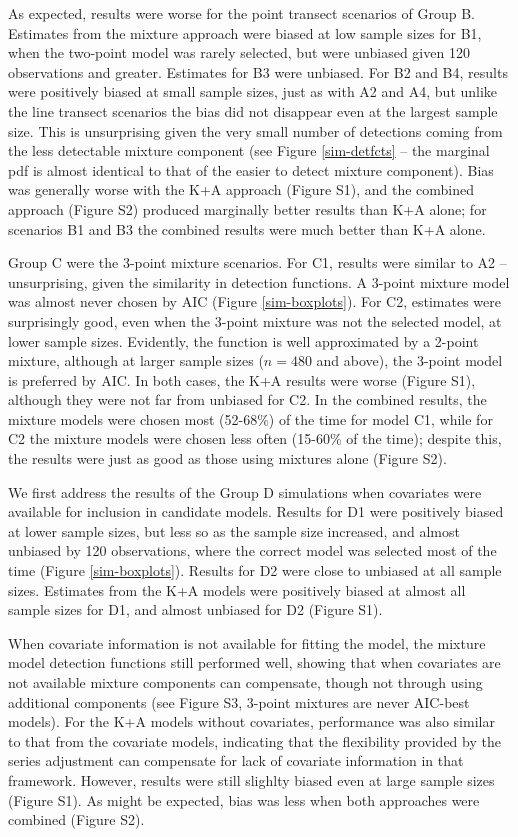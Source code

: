 \documentclass[10pt]{article}
\begin{document}
As expected, results were worse for the point transect scenarios of Group B. Estimates from the mixture approach were biased at low sample sizes for B1, when the two-point model was rarely selected, but were unbiased given 120 observations and greater. Estimates for B3 were unbiased.  For B2 and B4, results were positively biased at small sample sizes, just as with A2 and A4, but unlike the line transect scenarios the bias did not disappear even at the largest sample size. This is unsurprising given the very small number of detections coming from the less detectable mixture component (see Figure \ref{sim-detfcts} -- the marginal pdf is almost identical to that of the easier to detect mixture component). Bias was generally worse with the K+A approach (Figure S1), and the combined approach (Figure S2) produced marginally better results than K+A alone; for scenarios B1 and B3 the combined results were much better than K+A alone. 

Group C were the 3-point mixture scenarios.  For C1, results were similar to A2 -- unsurprising, given the similarity in detection functions.  A 3-point mixture model was almost never chosen by AIC (Figure \ref{sim-boxplots}).  For C2, estimates were surprisingly good, even when the 3-point mixture was not the selected model, at lower sample sizes.  Evidently, the function is well approximated by a 2-point mixture, although at larger sample sizes ($n=480$ and above), the 3-point model is preferred by AIC. In both cases, the K+A results were worse (Figure S1), although they were not far from unbiased for C2.  In the combined results, the mixture models were chosen most (52-68\%) of the time for model C1, while for C2 the mixture models were chosen less often (15-60\% of the time); despite this, the results were just as good as those using mixtures alone (Figure S2).

We first address the results of the Group D simulations when covariates were available for inclusion in candidate models. Results for D1 were positively biased at lower sample sizes, but less so as the sample size increased, and almost unbiased by 120 observations, where the correct model was selected most of the time (Figure \ref{sim-boxplots}).  Results for D2 were close to unbiased at all sample sizes. Estimates from the K+A models were positively biased at almost all sample sizes for D1, and almost unbiased for D2 (Figure S1).

When covariate information is not available for fitting the model, the mixture model detection functions still performed well, showing that when covariates are not available mixture components can compensate, though not through using additional components (see Figure S3, 3-point mixtures are never AIC-best models).  For the K+A models without covariates, performance was also similar to that from the covariate models, indicating that the flexibility provided by the series adjustment can compensate for lack of covariate information in that framework.  However, results were still slighlty biased even at large sample sizes (Figure S1).  As might be expected, bias was less when both approaches were combined (Figure S2).
\end{document}
